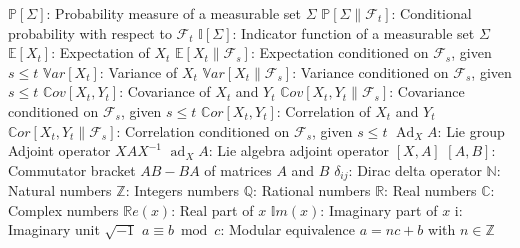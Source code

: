 \begin{tabbing}
	\addsymbol \mbox{$\mathbb{P}\left[\Sigma \right]$}: {Probability measure of a measurable set $\Sigma$}
	\addsymbol \mbox{$\mathbb{P}\left[\Sigma \parallel \mathscr{F}_t \right]$}: {Conditional probability with respect to $\mathscr{F}_t$}
	\addsymbol \mbox{$\mathbb{I}\left[\Sigma\right]$}: {Indicator function of a measurable set $\Sigma$}
	\addsymbol \mbox{$\mathbb{E}\left[X_t\right]$}: {Expectation of $X_t$}
	\addsymbol \mbox{$\mathbb{E}\left[X_t \parallel \mathscr{F}_s\right]$}: {Expectation conditioned on $\mathscr{F}_s$, given $s \leq t$}
	\addsymbol \mbox{$\mathbb{V}ar\left[X_t\right]$}: {Variance of $X_t$}
	\addsymbol \mbox{$\mathbb{V}ar\left[X_t \parallel \mathscr{F}_s\right]$}: {Variance  conditioned on $\mathscr{F}_s$, given $s \leq t$}
	\addsymbol \mbox{$\mathbb{C}ov\left[X_t, Y_t\right]$}: {Covariance of $X_t$ and $Y_t$}
	\addsymbol \mbox{$\mathbb{C}ov\left[X_t, Y_t \parallel \mathscr{F}_s\right]$}: {Covariance  conditioned on $\mathscr{F}_s$, given $s \leq t$}
	\addsymbol \mbox{$\mathbb{C}or\left[X_t, Y_t\right]$}: {Correlation of $X_t$ and $Y_t$}
	\addsymbol \mbox{$\mathbb{C}or\left[X_t, Y_t \parallel \mathscr{F}_s\right]$}: {Correlation  conditioned on $\mathscr{F}_s$, given $s \leq t$}
	\addsymbol \mbox{$\operatorname{Ad}_X A$}: {Lie group Adjoint operator $XAX^{-1}$}
	\addsymbol \mbox{$\operatorname{ad}_X A$}: {Lie algebra adjoint operator $\left[X,A\right]$}
	\addsymbol \mbox{$\left[A,B\right]$}: {Commutator bracket $AB - BA$ of matrices $A$ and $B$}
	\addsymbol \mbox{$\delta_{ij}$}: {Dirac delta operator}
	\addsymbol \mbox{$\mathbb{N}$}: {Natural numbers}
	\addsymbol \mbox{$\mathbb{Z}$}: {Integers numbers}
	\addsymbol \mbox{$\mathbb{Q}$}: {Rational numbers}
	\addsymbol \mbox{$\mathbb{R}$}: {Real numbers}
	\addsymbol \mbox{$\mathbb{C}$}: {Complex numbers}
	\addsymbol \mbox{$\mathbb{R}e\left(x\right)$}: {Real part of $x$}
	\addsymbol \mbox{$\mathbb{I}m\left(x\right)$}: {Imaginary part of $x$}
	\addsymbol \mbox{$\mathrm{i}$}: {Imaginary unit $\sqrt{-1}$}
	\addsymbol \mbox{$a \equiv b \bmod c$}: {Modular equivalence $a = nc + b$ with $n \in \mathbb{Z}$}
\end{tabbing}